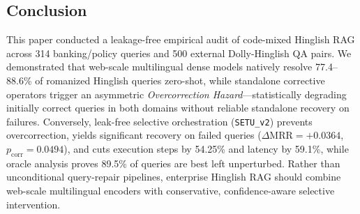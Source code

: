 \documentclass[conference]{IEEEtran}
\begin{document}
\subsection{Conclusion}
This paper conducted a leakage-free empirical audit of code-mixed Hinglish RAG across 314 banking/policy queries and 500 external Dolly-Hinglish QA pairs. We demonstrated that web-scale multilingual dense models natively resolve 77.4--88.6\% of romanized Hinglish queries zero-shot, while standalone corrective operators trigger an asymmetric \textit{Overcorrection Hazard}---statistically degrading initially correct queries in both domains without reliable standalone recovery on failures. Conversely, leak-free selective orchestration (\texttt{SETU\_v2}) prevents overcorrection, yields significant recovery on failed queries ($\Delta\text{MRR} = +0.0364$, $p_{\text{corr}} = 0.0494$), and cuts execution steps by 54.25\% and latency by 59.1\%, while oracle analysis proves 89.5\% of queries are best left unperturbed. Rather than unconditional query-repair pipelines, enterprise Hinglish RAG should combine web-scale multilingual encoders with conservative, confidence-aware selective intervention.



\end{document}
